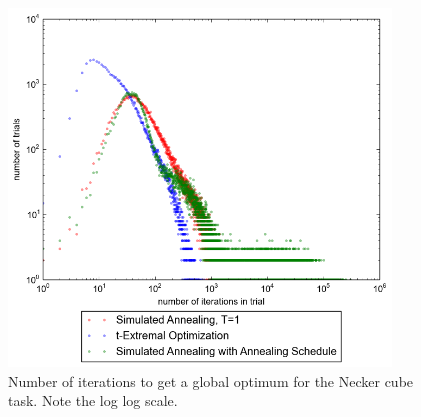 \documentclass[12pt]{article}
\begin{document}
\begin{figure}
  \label{fig:speed}
  \includegraphics[width=4in]{iter_hist}
  \caption{Number of iterations to get a global optimum for the Necker cube task. Note the log log scale.}
\end{figure}
\end{document}
